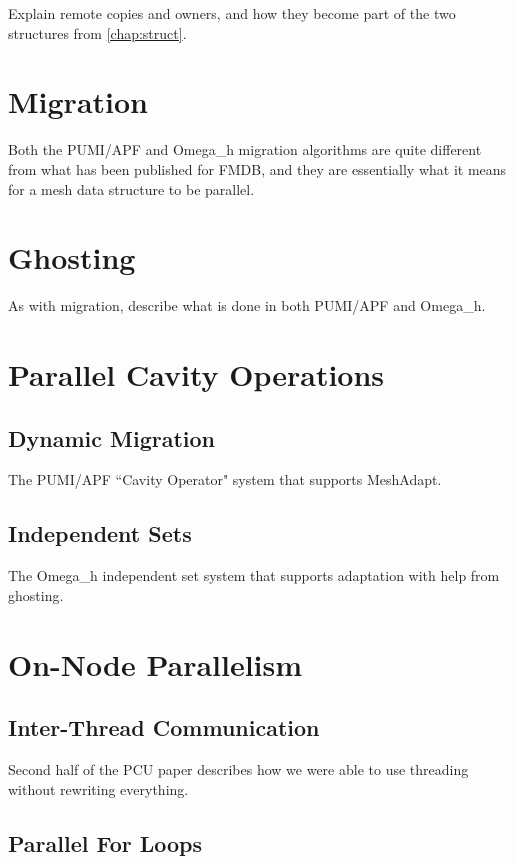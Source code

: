 Explain remote copies and owners, and how they become
part of the two structures from \ref{chap:struct}.

\section{Migration}

Both the PUMI/APF and Omega\_h migration algorithms
are quite different from what has been published for FMDB,
and they are essentially what it means for a mesh
data structure to be parallel.

\section{Ghosting}

As with migration, describe what is done in both PUMI/APF
and Omega\_h.

\section{Parallel Cavity Operations}

\subsection{Dynamic Migration}
\label{sec:cavity_operator}

The PUMI/APF ``Cavity Operator" system that supports MeshAdapt.

\subsection{Independent Sets}
\label{sec:indset}

The Omega\_h independent set system that supports adaptation
with help from ghosting.

\section{On-Node Parallelism}

\subsection{Inter-Thread Communication}
\label{sec:itc}

Second half of the PCU paper describes how we were able to use
threading without rewriting everything.

\subsection{Parallel For Loops}
\label{sec:parallel_for}

